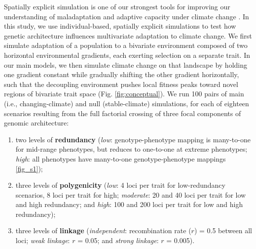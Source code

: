 \documentclass[9pt,twocolumn,twoside,lineno]{pnas-new}
\begin{document}
Spatially explicit simulation is one of our strongest tools
for improving our understanding of maladaptation and adaptive capacity
under climate change \cite{capblancq_review}.
In this study, we use individual-based, spatially explicit simulations
to test how genetic architecture influences multivariate adaptation to climate change.
We first simulate 
adaptation of a population to a bivariate environment composed of two horizontal 
environmental gradients, each exerting selection on a separate trait.
In our main models, we then simulate climate change on that landscape by holding one gradient 
constant while gradually shifting the other gradient horizontally, such that
the decoupling environment pushes local fitness peaks toward novel regions 
of bivariate trait space (Fig. \ref{fig:conceptual}).
We run 100 pairs of main (i.e., changing-climate)
and null (stable-climate) simulations, for each of eighteen scenarios
resulting from the full factorial crossing of three focal components
of genomic architecture:
\begin{enumerate}
    \item two levels of \textbf{redundancy} (\textit{low}: genotype-phenotype mapping is many-to-one for mid-range phenotypes, but reduces to one-to-one at extreme phenotypes; \textit{high}: all phenotypes have many-to-one genotype-phenotype mappings \ref{fig_s1}); 
    \item three levels of \textbf{polygenicity} (\textit{low}: 4 loci per trait for low-redundancy scenarios, 8 loci per trait for high; \textit{moderate}: 20 and 40 loci per trait for low and high redundancy; and \textit{high}: 100 and 200 loci per trait for low and high redundancy);
    \item three levels of \textbf{linkage} (\textit{independent}: recombination rate ($r$) = 0.5 between all loci; \textit{weak linkage}: $r$ = 0.05; and \textit{strong linkage}: $r$ = 0.005).
\end{enumerate}
\end{document}
